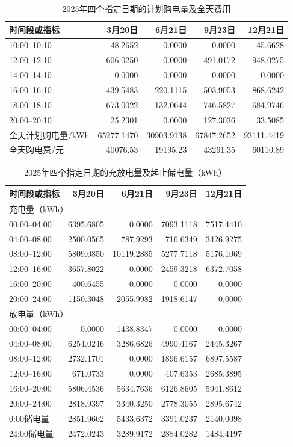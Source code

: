 \begin{table}[H]\centering\small
\caption{2025年四个指定日期的计划购电量及全天费用}\label{tab:q2-purchase-dates}
\begin{tabular}{lrrrr}\toprule
时间段或指标&3月20日&6月21日&9月23日&12月21日\\\midrule
10:00--10:10&48.2652&0.0000&0.0000&45.6628\\
12:00--12:10&606.0250&0.0000&491.0172&948.0275\\
14:00--14:10&0.0000&0.0000&0.0000&0.0000\\
16:00--16:10&439.5483&220.1115&503.9053&868.6242\\
18:00--18:10&673.0022&132.0644&746.5827&684.9746\\
20:00--20:10&25.2301&0.0000&127.3036&33.5085\\
\midrule
全天计划购电量/kWh&65277.1470&30903.9138&67847.2652&93111.4419\\
全天购电费/元&40076.53&19195.23&43261.35&60110.89\\
\bottomrule\end{tabular}\end{table}
\begin{table}[H]\centering\small
\caption{2025年四个指定日期的充放电量及起止储电量（kWh）}\label{tab:q2-battery-dates}
\begin{tabular}{lrrrr}\toprule
时间段或指标&3月20日&6月21日&9月23日&12月21日\\\midrule
\multicolumn{5}{l}{充电量（kWh）}\\
00:00--04:00&6395.6805&0.0000&7093.1118&7517.4410\\
04:00--08:00&2500.0565&787.9293&716.6349&3426.9275\\
08:00--12:00&5809.0850&10119.2885&5277.7118&5176.1069\\
12:00--16:00&3657.8022&0.0000&2459.3218&6372.7058\\
16:00--20:00&400.6455&0.0000&0.0000&0.0000\\
20:00--24:00&1150.3048&2055.9982&1918.6147&0.0000\\
\midrule
\multicolumn{5}{l}{放电量（kWh）}\\
00:00--04:00&0.0000&1438.8347&0.0000&0.0000\\
04:00--08:00&6254.0246&3286.6826&4990.4167&2445.3267\\
08:00--12:00&2732.1701&0.0000&1896.6157&6897.5587\\
12:00--16:00&671.0733&0.0000&407.6353&2685.3895\\
16:00--20:00&5806.4536&5634.7636&6126.8605&5941.8612\\
20:00--24:00&2818.9397&3340.3250&2778.3055&2895.6742\\
\midrule
0:00储电量&2851.9662&5433.6372&3391.0237&2140.0098\\
24:00储电量&2472.0243&3289.9172&2884.0282&1484.4197\\
\bottomrule\end{tabular}\end{table}
